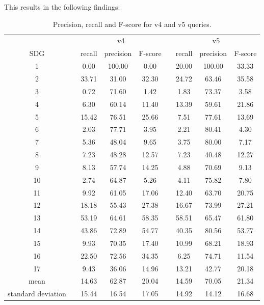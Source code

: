 \documentclass{article}
\begin{document}
This results in the following findings:

\begin{table}[H]
\centering 
\begin{tabular}{c c ccc c ccc}
\toprule
&&\multicolumn{3}{c}{v4}&&\multicolumn{3}{c}{v5}\\
\cline{3-5} \cline{7-9}
SDG && recall & precision & F-score && recall & precision & F-score \\
 \hline
 1 && 0.00 & 100.00 & 0.00 && 20.00 & 100.00 & 33.33 \\
 2 && 33.71 & 31.00 & 32.30 && 24.72 & 63.46 & 35.58 \\
 3 && 0.72 & 71.60 & 1.42 && 1.83 & 73.37 & 3.58 \\
 4 && 6.30 & 60.14 & 11.40 && 13.39 & 59.61 & 21.86 \\
 5 && 15.42 & 76.51 & 25.66 && 7.51 & 77.61 & 13.69 \\
 6 && 2.03 & 77.71 & 3.95 && 2.21 & 80.41 & 4.30 \\
 7 && 5.36 & 48.04 & 9.65 && 3.75 & 80.00 & 7.17 \\
 8 && 7.23 & 48.28 & 12.57 && 7.23 & 40.48 & 12.27 \\
 9 && 8.13 & 57.74 & 14.25 && 4.88 & 70.69 & 9.13 \\
 10 && 2.74 & 64.87 & 5.26 && 4.11 & 75.82 & 7.80 \\
 11 && 9.92 & 61.05 & 17.06 && 12.40 & 63.70 & 20.75 \\
 12 && 18.18 & 55.43 & 27.38 && 16.67 & 73.99 & 27.21 \\
 13 && 53.19 & 64.61 & 58.35 && 58.51 & 65.47 & 61.80 \\
 14 && 43.86 & 72.89 & 54.77 && 40.35 & 80.56 & 53.77 \\
 15 && 9.93 & 70.35 & 17.40 && 10.99 & 68.21 & 18.93 \\
 16 && 22.50 & 72.56 & 34.35 && 6.25 & 74.71 & 11.54 \\
 17 && 9.43 & 36.06 & 14.96 && 13.21 & 42.77 & 20.18 \\
 \hline
 mean && 14.63 & 62.87 & 20.04 && 14.59 & 70.05 & 21.34 \\
 standard deviation && 15.44 & 16.54 & 17.05 && 14.92 & 14.12 & 16.68\\
 \bottomrule
\end{tabular}
\caption{Precision, recall and F-score for v4 and v5 queries.}
\label{precisiondatatab}
\end{table}
\end{document}
